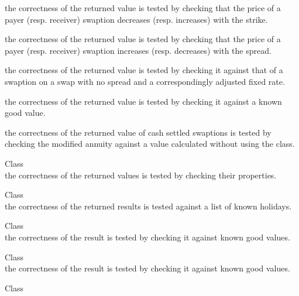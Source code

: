 \begin{DoxyRefList}
\begin{DoxyItemize}
\item the correctness of the returned value is tested by checking that the price of a payer (resp. receiver) swaption decreases (resp. increases) with the strike.
\item the correctness of the returned value is tested by checking that the price of a payer (resp. receiver) swaption increases (resp. decreases) with the spread.
\item the correctness of the returned value is tested by checking it against that of a swaption on a swap with no spread and a correspondingly adjusted fixed rate.
\item the correctness of the returned value is tested by checking it against a known good value.
\item the correctness of the returned value of cash settled swaptions is tested by checking the modified annuity against a value calculated without using the  class.
\end{DoxyItemize}
\item[Class \doxylink{class_quant_lib_1_1_symmetric_schur_decomposition}{Quant\+Lib\+::Symmetric\+Schur\+Decomposition} ]\hfill \\
\label{test__test000053}%
%
the correctness of the returned values is tested by checking their properties.  
\item[Class \doxylink{class_quant_lib_1_1_t_a_r_g_e_t}{Quant\+Lib\+::TARGET} ]\hfill \\
\label{test__test000175}%
%
the correctness of the returned results is tested against a list of known holidays.  
\item[Class \doxylink{class_quant_lib_1_1_tqr_eigen_decomposition}{Quant\+Lib\+::Tqr\+Eigen\+Decomposition} ]\hfill \\
\label{test__test000056}%
%
the correctness of the result is tested by checking it against known good values.  
\item[Class \doxylink{class_quant_lib_1_1_trapezoid_integral}{Quant\+Lib\+::Trapezoid\+Integral\texorpdfstring{$<$}{<} Integration\+Policy \texorpdfstring{$>$}{>}} ]\hfill \\
\label{test__test000046}%
%
the correctness of the result is tested by checking it against known good values.  
\item[Class \doxylink{class_quant_lib_1_1_tree_swaption_engine}{Quant\+Lib\+::Tree\+Swaption\+Engine} ]\hfill \\

\end{DoxyRefList}
